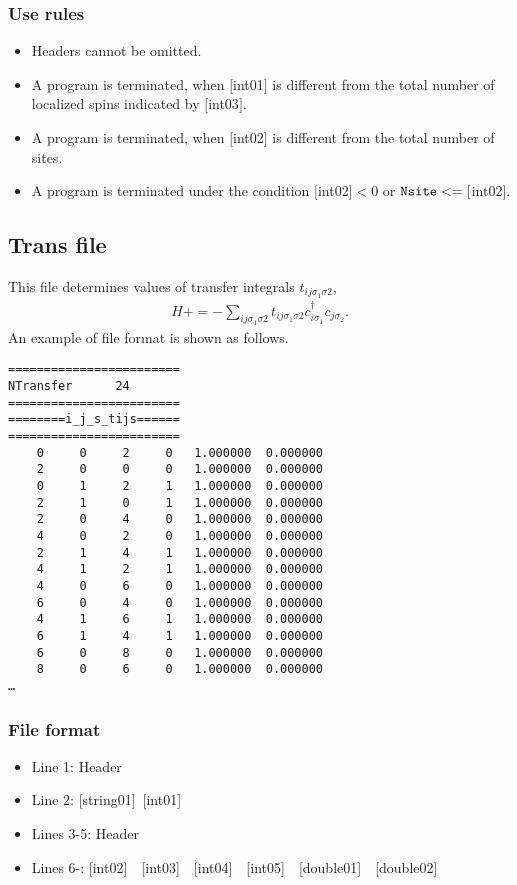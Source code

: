 \subsubsection{Use rules}
\begin{itemize}
\item Headers cannot be omitted. 
\item A program is terminated, when $[$int01$]$ is different from the total number of localized spins indicated by $[$int03$]$.
\item A program is terminated, when $[$int02$]$ is different from the total number of sites.
\item A program is terminated under the condition $[$int02$]<0$ or $\verb|Nsite|<=[$int02$]$.
\end{itemize}

\newpage
\subsection{Trans file}
\label{Subsec:Trans}
This file determines values of transfer integrals $t_{ij\sigma_1\sigma2}$,
\begin{align}
H +=-\sum_{ij\sigma_1\sigma2} t_{ij\sigma_1\sigma2}c_{i\sigma_1}^{\dag}c_{j\sigma_2}.
\end{align}
An example of file format is shown as follows.\\
\begin{minipage}{12.5cm}
\begin{screen}
\begin{verbatim}
======================== 
NTransfer      24  
======================== 
========i_j_s_tijs====== 
======================== 
    0     0     2     0   1.000000  0.000000
    2     0     0     0   1.000000  0.000000
    0     1     2     1   1.000000  0.000000
    2     1     0     1   1.000000  0.000000
    2     0     4     0   1.000000  0.000000
    4     0     2     0   1.000000  0.000000
    2     1     4     1   1.000000  0.000000
    4     1     2     1   1.000000  0.000000
    4     0     6     0   1.000000  0.000000
    6     0     4     0   1.000000  0.000000
    4     1     6     1   1.000000  0.000000
    6     1     4     1   1.000000  0.000000
    6     0     8     0   1.000000  0.000000
    8     0     6     0   1.000000  0.000000
…
\end{verbatim}
\end{screen}
\end{minipage}

\subsubsection{File format}
\begin{itemize}
   \item  Line 1:  Header
   \item  Line 2:   [string01]~[int01]
   \item  Lines 3-5:  Header
   \item  Lines 6-: [int02]~~[int03]~~[int04]~~[int05]~~[double01]~~[double02] 
  \end{itemize}
